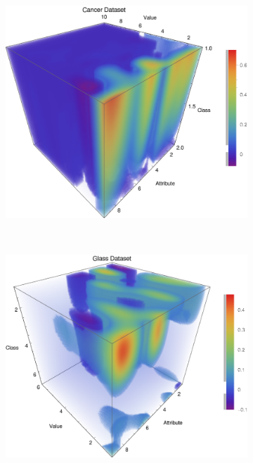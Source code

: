 \documentclass{article}
\begin{document}
		\begin{figure}[h!]
			\centering
			\begin{subfigure}[b]{0.32\textwidth}
				\centering
				\includegraphics[width=\textwidth]{figs/NaiveBayes/plot_ptable_cancer}	
				\caption{}
				\label{p_cancer}				
			\end{subfigure}	\	
			\begin{subfigure}[b]{0.32\textwidth}
				\centering
				\includegraphics[width=\textwidth]{figs/NaiveBayes/plot_ptable_glass}

\end{subfigure}
\end{figure}
\end{document}
